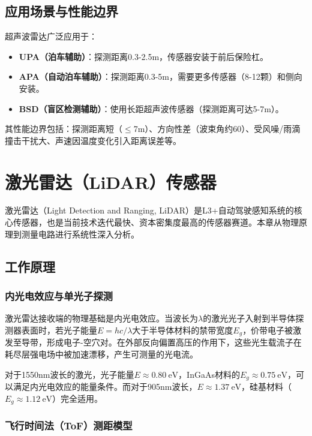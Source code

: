 \documentclass[12pt,a4paper,openany,UTF8]{ctexbook}
\begin{document}
\section{应用场景与性能边界}

超声波雷达广泛应用于：
\begin{itemize}
    \item \textbf{UPA（泊车辅助）}：探测距离0.3-2.5m，传感器安装于前后保险杠。
    \item \textbf{APA（自动泊车辅助）}：探测距离0.3-5m，需要更多传感器（8-12颗）和侧向安装。
    \item \textbf{BSD（盲区检测辅助）}：使用长距超声波传感器（探测距离可达5-7m）。
\end{itemize}

其性能边界包括：探测距离短（$\leq$7m）、方向性差（波束角约60\textdegree）、受风噪/雨滴撞击干扰大、声速因温度变化引入距离误差等。

\clearpage

\chapter{激光雷达（LiDAR）传感器}

激光雷达（Light Detection and Ranging, LiDAR）是L3+自动驾驶感知系统的核心传感器，也是当前技术迭代最快、资本密集度最高的传感器赛道。本章从物理原理到测量电路进行系统性深入分析。

\section{工作原理}

\subsection{内光电效应与单光子探测}

激光雷达接收端的物理基础是内光电效应。当波长为$\lambda$的激光光子入射到半导体探测器表面时，若光子能量$E = hc/\lambda$大于半导体材料的禁带宽度$E_g$，价带电子被激发至导带，形成电子-空穴对。在外部反向偏置高压的作用下，这些光生载流子在耗尽层强电场中被加速漂移，产生可测量的光电流。

对于1550nm波长的激光，光子能量$E \approx 0.80\ \text{eV}$，InGaAs材料的$E_g \approx 0.75\ \text{eV}$，可以满足内光电效应的能量条件。而对于905nm波长，$E \approx 1.37\ \text{eV}$，硅基材料（$E_g \approx 1.12\ \text{eV}$）完全适用。

\subsection{飞行时间法（ToF）测距模型}
\end{document}
